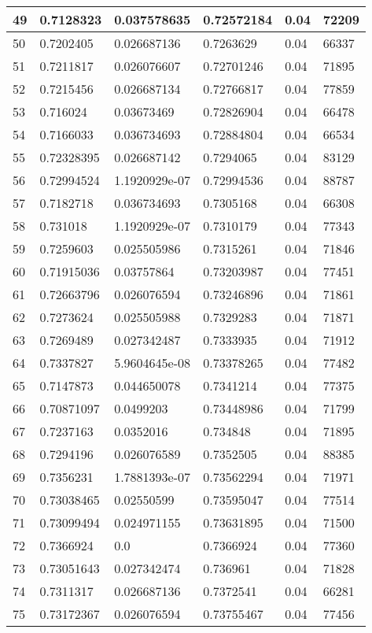 \begin{longtable}{|l|l|l|l|l|l|}
49 & 0.7128323 & 0.037578635 & 0.72572184 & 0.04 & 72209 \\ \hline 
50 & 0.7202405 & 0.026687136 & 0.7263629 & 0.04 & 66337 \\ \hline 
51 & 0.7211817 & 0.026076607 & 0.72701246 & 0.04 & 71895 \\ \hline 
52 & 0.7215456 & 0.026687134 & 0.72766817 & 0.04 & 77859 \\ \hline 
53 & 0.716024 & 0.03673469 & 0.72826904 & 0.04 & 66478 \\ \hline 
54 & 0.7166033 & 0.036734693 & 0.72884804 & 0.04 & 66534 \\ \hline 
55 & 0.72328395 & 0.026687142 & 0.7294065 & 0.04 & 83129 \\ \hline 
56 & 0.72994524 & 1.1920929e-07 & 0.72994536 & 0.04 & 88787 \\ \hline 
57 & 0.7182718 & 0.036734693 & 0.7305168 & 0.04 & 66308 \\ \hline 
58 & 0.731018 & 1.1920929e-07 & 0.7310179 & 0.04 & 77343 \\ \hline 
59 & 0.7259603 & 0.025505986 & 0.7315261 & 0.04 & 71846 \\ \hline 
60 & 0.71915036 & 0.03757864 & 0.73203987 & 0.04 & 77451 \\ \hline 
61 & 0.72663796 & 0.026076594 & 0.73246896 & 0.04 & 71861 \\ \hline 
62 & 0.7273624 & 0.025505988 & 0.7329283 & 0.04 & 71871 \\ \hline 
63 & 0.7269489 & 0.027342487 & 0.7333935 & 0.04 & 71912 \\ \hline 
64 & 0.7337827 & 5.9604645e-08 & 0.73378265 & 0.04 & 77482 \\ \hline 
65 & 0.7147873 & 0.044650078 & 0.7341214 & 0.04 & 77375 \\ \hline 
66 & 0.70871097 & 0.0499203 & 0.73448986 & 0.04 & 71799 \\ \hline 
67 & 0.7237163 & 0.0352016 & 0.734848 & 0.04 & 71895 \\ \hline 
68 & 0.7294196 & 0.026076589 & 0.7352505 & 0.04 & 88385 \\ \hline 
69 & 0.7356231 & 1.7881393e-07 & 0.73562294 & 0.04 & 71971 \\ \hline 
70 & 0.73038465 & 0.02550599 & 0.73595047 & 0.04 & 77514 \\ \hline 
71 & 0.73099494 & 0.024971155 & 0.73631895 & 0.04 & 71500 \\ \hline 
72 & 0.7366924 & 0.0 & 0.7366924 & 0.04 & 77360 \\ \hline 
73 & 0.73051643 & 0.027342474 & 0.736961 & 0.04 & 71828 \\ \hline 
74 & 0.7311317 & 0.026687136 & 0.7372541 & 0.04 & 66281 \\ \hline 
75 & 0.73172367 & 0.026076594 & 0.73755467 & 0.04 & 77456 \\ \hline 
\end{longtable}